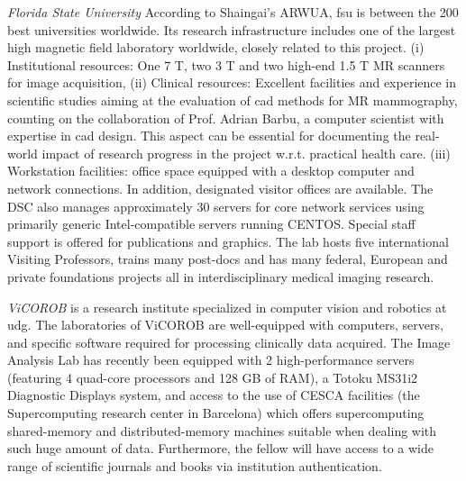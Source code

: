 \emph{Florida State University} 
According to Shaingai's ARWUA, \ac{fsu} is between the 200 best universities worldwide. 
Its research infrastructure includes one of the largest high magnetic field laboratory worldwide, closely related to this project. 
(i) Institutional resources: One 7 T, two 3 T and two high-end 1.5 T MR scanners for image acquisition,
(ii) Clinical resources: Excellent facilities and experience in scientific studies aiming at the evaluation of \ac{cad} methods for MR mammography, counting on the collaboration of Prof. Adrian Barbu, a computer scientist with expertise in \ac{cad} design. 
This aspect can be essential for documenting the real-world impact of research progress in the project w.r.t. practical health care. 
(iii) Workstation facilities: office space equipped with a desktop computer and network connections. 
In addition, designated visitor offices are available. 
The DSC also manages approximately 30 servers for core network services using primarily generic Intel-compatible servers running CENTOS. 
Special staff support is offered for publications and graphics.
The lab hosts five international Visiting Professors, trains many post-docs and has many federal, European and private foundations projects all in interdisciplinary medical imaging research.

\emph{ViCOROB} is a research institute specialized in computer vision and robotics at \ac{udg}.
The laboratories of ViCOROB are well-equipped with computers, servers, and specific software required for processing clinically data acquired. 
The Image Analysis Lab has recently been equipped with 2 high-performance servers (featuring 4 quad-core processors and 128 GB of RAM), a Totoku MS31i2 Diagnostic Displays system, and access to the use of CESCA facilities (the Supercomputing research center in Barcelona) which offers supercomputing shared-memory and distributed-memory machines suitable when dealing with such huge amount of data.
Furthermore, the fellow will have access to a wide range of scientific journals and books via institution authentication.


